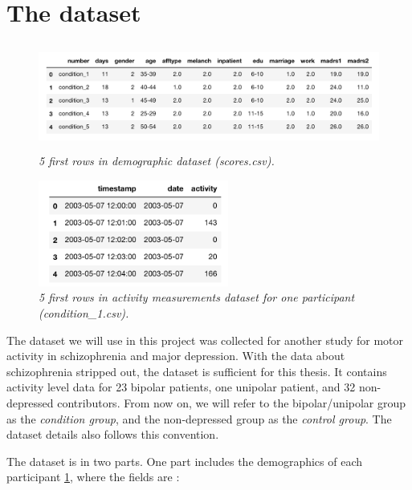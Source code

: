 \section{The dataset}

\begin{figure}
    \begin{center}
        \includegraphics[height=3.5cm]{img/demographics.png}
        \caption{\textit{5 first rows in demographic dataset (scores.csv).}}
        \label{figure:demographics}
    \end{center}
\end{figure}

\begin{figure}
    \begin{center}
        \includegraphics[height=3.5cm]{img/participant.png}
        \caption{\textit{5 first rows in activity measurements dataset for one participant (condition\_1.csv).}}
        \label{figure:participant_activity}
    \end{center}
\end{figure}

The dataset we will use in this project \cite{dataset} was collected for another study for motor activity in schizophrenia and major depression. With the data about schizophrenia stripped out, the dataset is sufficient for this thesis. It contains activity level data for 23 bipolar patients, one unipolar patient, and 32 non-depressed contributors. From now on, we will refer to the bipolar/unipolar group as the \textit{condition group}, and the non-depressed group as the \textit{control group}. The dataset details \cite{dataset_details} also follows this convention.

The dataset is in two parts. One part includes the demographics of each participant \ref{figure:demographics}, where the fields are \cite{dataset_details}:

